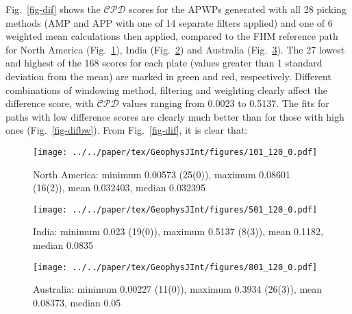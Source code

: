 Fig.~\ref{fig-dif} shows the $\mathcal{CPD}$ scores for the APWPs generated with
all 28 picking methods (AMP and APP with one of 14 separate filters applied) and
one of 6 weighted mean calculations then applied, compared to the FHM reference
path for North America (Fig.~\ref{fig-na-dif}), India (Fig.~\ref{fig-in-dif})
and Australia (Fig.~\ref{fig-au-dif}). The 27 lowest and highest of the 168
scores for each plate (values greater than 1 standard deviation from the mean)
are marked in green and red, respectively. Different combinations of windowing
method, filtering and weighting clearly affect the difference score, with
$\mathcal{CPD}$ values ranging from 0.0023 to 0.5137. The fits for paths with
low difference scores are clearly much better than for those with high ones
(Fig.~\ref{fig-difbw}). From Fig.~\ref{fig-dif}, it is clear that:

\begin{figure*}
  \vspace*{-1.1cm}
	\centering
	\begin{subfigure}{.94\textwidth}
		\texttt{[image: ../../paper/tex/GeophysJInt/figures/101\_120\_0.pdf]}
		\caption{North America: minimum 0.00573 (25(0)), maximum
		0.08601 (16(2)), mean 0.032403, median 0.032395}\label{fig-na-dif} %
	\end{subfigure}
	\vspace{.1em} %
	\begin{subfigure}{.94\textwidth}
		\texttt{[image: ../../paper/tex/GeophysJInt/figures/501\_120\_0.pdf]}
		\caption{India: minimum 0.023 (19(0)), maximum 0.5137 (8(3)),
		mean 0.1182, median 0.0835}\label{fig-in-dif} %
	\end{subfigure}
	\vspace{.1em}
	\begin{subfigure}{.94\textwidth}
		\texttt{[image: ../../paper/tex/GeophysJInt/figures/801\_120\_0.pdf]}
		\caption{Australia: minimum 0.00227 (11(0)), maximum
		0.3934 (26(3)), mean 0.08373, median 0.05}\label{fig-au-dif} %
	\end{subfigure}
	\caption[Differences of each plate's paleomagnetic APWPs versus its FHM
predicted APWP]{Equal-weight composite path difference ($\mathcal{CPD}$) values
between each continent's paleomagnetic APWPs and its predicted APWP from FHM and
related plate circuits. The paths are in 10 Myr bin and 5 Myr step. The
difference values less than one-standard-deviation interval of the whole 168
values (lower 15.866 per cent) are colored in green, more than
one-standard-deviation interval (upper 15.866 per cent) colored in red. Exactly
the same columns are connected. The percentages of removed paleopoles are
derived relative to Pk 1, corrected relative to each corresponding picking
method (Pk 8,9, 12,13; 1 paleopole removed and 1 corrected by Pk 20,21 for India). Fit
quality (FQ) for each score is color coded.}\label{fig-dif} %
\end{figure*}

